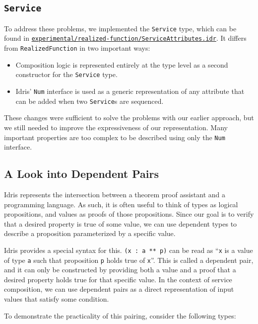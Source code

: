 \documentclass[]{report}
\begin{document}
\subsection{\texttt{Service}}
To address these problems, we implemented the \texttt{Service} type,
which can be found in
\href{https://github.com/singnet/ai-dsl/blob/master/experimental/realized-function/ServiceAttributes.idr}{\texttt{experimental/realized-function/ServiceAttributes.idr}}.
It differs from \texttt{RealizedFunction} in two important ways:
\begin{itemize}
  \item Composition logic is represented entirely at the type level as a second
        constructor for the \texttt{Service} type.

  \item Idris' \texttt{Num} interface is used as a generic representation of any
        attribute that can be added when two \texttt{Service}s are sequenced.

\end{itemize}

These changes were sufficient to solve the problems with our earlier approach,
but we still needed to improve the expressiveness of our representation.  Many
important properties are too complex to be described using only the \texttt{Num}
interface.

\subsection{A Look into Dependent Pairs}
\label{sec:dependent_pairs}
Idris represents the intersection between a theorem proof assistant and a
programming language.  As such, it is often useful to think of types as
logical propositions, and values as proofs of those propositions.  Since our
goal is to verify that a desired property is true of some value, we can use
dependent types to describe a proposition parameterized by a specific value.

Idris provides a special syntax for this.
\texttt{(x : a ** p)} can be read as ``\texttt{x} is a value of type \texttt{a} such that
proposition \texttt{p} holds true of \texttt{x}''.  This is called a dependent pair, and it can
only be constructed by providing both a value and a proof that a desired
property holds true for that specific value.  In the context of service
composition, we can use dependent pairs as a direct representation of input
values that satisfy some condition.

To demonstrate the practicality of this pairing, consider the following types:
\end{document}
